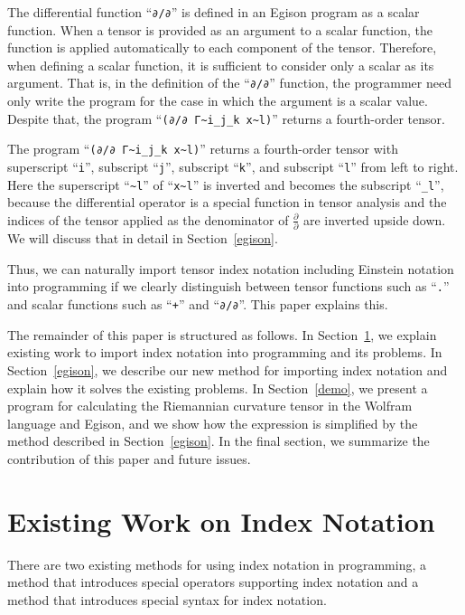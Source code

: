 \documentclass[acmlarge]{acmart}
\begin{document}
The differential function ``\texttt{∂/∂}'' is defined in an Egison program as a scalar function.
When a tensor is provided as an argument to a scalar function, the function is applied automatically to each component of the tensor.
Therefore, when defining a scalar function, it is sufficient to consider only a scalar as its argument.
That is, in the definition of the ``\texttt{∂/∂}'' function, the programmer need only write the program for the case in which the argument is a scalar value.
Despite that, the program ``\verb|(∂/∂ Γ~i_j_k x~l)|'' returns a fourth-order tensor.

The program ``\verb|(∂/∂ Γ~i_j_k x~l)|'' returns a fourth-order tensor with superscript ``\texttt{i}'', subscript ``\texttt{j}'', subscript ``\texttt{k}'', and subscript ``\texttt{l}'' from left to right.
Here the superscript ``\verb|~l|'' of ``\verb|x~l|'' is inverted and becomes the subscript ``\verb|_l|'', because the differential operator is a special function in tensor analysis and the indices of the tensor applied as the denominator of $\frac{\partial}{\partial}$ are inverted upside down.
We will discuss that in detail in Section~\ref{egison}.

Thus, we can naturally import tensor index notation including Einstein notation into programming if we clearly distinguish between tensor functions such as ``\texttt{.}'' and scalar functions such as ``\texttt{+}'' and ``\texttt{∂/∂}''.
This paper explains this.

The remainder of this paper is structured as follows.
In Section~\ref{related}, we explain existing work to import index notation into programming and its problems.
In Section~\ref{egison}, we describe our new method for importing index notation and explain how it solves the existing problems.
In Section~\ref{demo}, we present a program for calculating the Riemannian curvature tensor in the Wolfram language and Egison, and we show how the expression is simplified by the method described in Section~\ref{egison}.
In the final section, we summarize the contribution of this paper and future issues.

\section{Existing Work on Index Notation}\label{related}

There are two existing methods for using index notation in programming, a method that introduces special operators supporting index notation and a method that introduces special syntax for index notation.
\end{document}

